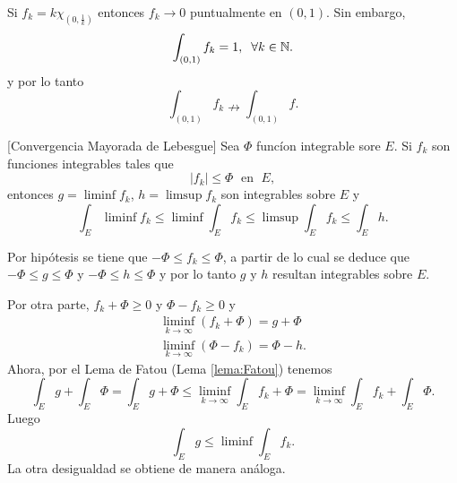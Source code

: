                     \begin{ejemplo}{}
                    Si $f_k=k \chi_{(0,\frac{1}{k})}$ entonces $f_k \to 0$ puntualmente en $(0,1)$. Sin embargo,
                     \[
                    \int_{(0,1)} f_k = 1,\;\; \forall k\in \mathbb{N}.
                    \]
                     y por lo tanto 
                     \[
                    \int_{(0,1)} f_k  \nrightarrow \int_{(0,1)} f.
                    \]
                    \end{ejemplo}
                    
                    \begin{teorema}{}[Convergencia Mayorada de Lebesgue]
                    Sea $\Phi$ func\'ion integrable sore $E$. 
                    Si $f_k$ son funciones integrables tales que 
                    \[|f_k|\leq \Phi\;\mbox{ en }\;E,\]    
                    entonces
                    $g=\liminf f_k$, $h=\limsup
                    f_k$ son integrables sobre $E$ y 
                    \[
                    \int_E \liminf f_k \leq 
                    \liminf \int_E f_k \leq\limsup \int_E f_k
                    \leq \int_E h.
                    \]
                    \end{teorema}
                    
                    \begin{demo}
                    Por hip\'otesis se tiene que $-\Phi \leq f_k \leq \Phi$, a partir de lo cual se deduce que 
                    $-\Phi \leq g\leq \Phi$ y  $-\Phi \leq h\leq \Phi$ y por lo tanto $g$ y $h$ resultan integrables sobre $E$.
                    
                    Por otra parte,  $f_k+\Phi \geq 0$ y $\Phi-f_k\geq 0$ y 
                    \[\begin{split}
                    \liminf\limits_{k \to \infty} (f_k+\Phi)=g+\Phi
                    \\
                    \liminf\limits_{k \to \infty} (\Phi-f_k)=\Phi-h.
                    \end{split}
                    \]
                    Ahora, por el Lema de Fatou (Lema \ref{lema:Fatou}) tenemos
                    \[
                    \int_E g + \int_E \Phi =
                    \int_E g+\Phi \leq \liminf\limits_{k \to \infty} \int_E f_k +\Phi=
                    \liminf\limits_{k \to \infty} \int_E f_k +\int_E \Phi.
                    \]
                    Luego 
                    \[
                    \int_E g \leq \liminf \int_E f_k.
                    \]
                    La otra desigualdad se obtiene de manera an\'aloga.
                    \end{demo}
                    
